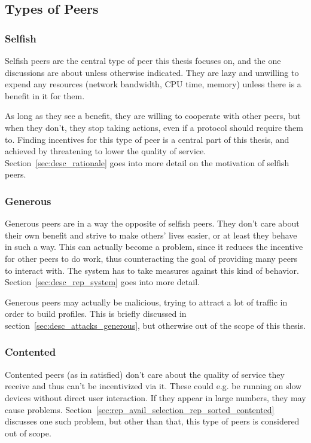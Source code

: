 \subsection{Types of Peers}
\subsubsection{Selfish}
Selfish peers are the central type of peer this thesis focuses on, and the one
discussions are about unless otherwise indicated. They are lazy
and unwilling to expend any resources (network bandwidth, CPU time, memory)
unless there is a benefit in it for them.

As long as they see a benefit, they are willing to cooperate with other peers,
but when they don't, they stop taking actions, even if a protocol should require
them to. Finding incentives for this type of peer is a central part of this
thesis, and achieved by threatening to lower the quality of service.
Section~\ref{sec:desc_rationale} goes into more detail on the motivation of
selfish peers.

\subsubsection{Generous}
\label{sec:desc_generous_peers}
Generous peers are in a way the opposite of selfish peers. They don't care about
their own benefit and strive to make others' lives easier, or at least they
behave in such a way. This can actually become a problem, since it reduces the
incentive for other peers to do work, thus counteracting the goal of providing
many peers to interact with. The system has to take measures against this kind
of behavior. Section~\ref{sec:desc_rep_system} goes into more detail.

Generous peers may actually be malicious, trying to attract a lot of traffic in
order to build profiles. This is briefly discussed in
section~\ref{sec:desc_attacks_generous}, but otherwise out of the scope of this
thesis.

\subsubsection{Contented}
\label{sec:desc_contented_peers}
Contented peers (as in satisfied) don't care about the quality of service they
receive and thus can't be incentivized via it. These could e.g. be running on
slow devices without direct user interaction. If they appear in large numbers,
they may cause problems.
Section~\ref{sec:rep_avail_selection_rep_sorted_contented} discusses one such
problem, but other than that, this type of peers is considered out of scope.

